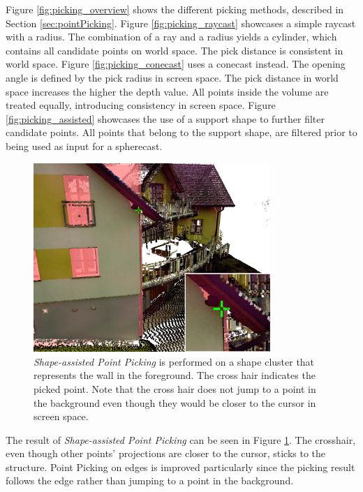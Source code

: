 Figure \ref{fig:picking_overview} shows the different picking methods, described in Section \ref{sec:pointPicking}. Figure \ref{fig:picking_raycast} showcases a simple raycast with a radius. The combination of a ray and a radius yields a cylinder, which contains all candidate points on world space. The pick distance is consistent in world space. Figure \ref{fig:picking_conecast} uses a conecast instead. The opening angle is defined by the pick radius in screen space. The pick distance in world space increases the higher the depth value. All points inside the volume are treated equally, introducing consistency in screen space. Figure \ref{fig:picking_assisted} showcases the use of a support shape to further filter candidate points. All points that belong to the support shape, are filtered prior to being used as input for a spherecast. 


\begin{figure}
    \centering
    \includegraphics[width=0.8\textwidth]{Interactions/picking_assisted_screenshot.png}%
    \caption{\textit{Shape-assisted Point Picking} is performed on a shape cluster that represents the wall in the foreground. The cross hair indicates the picked point. Note that the cross hair does not jump to a point in the background even though they would be closer to the cursor in screen space. }
    \label{fig:picking_assisted_screenshot}
\end{figure}

The result of \textit{Shape-assisted Point Picking} can be seen in Figure \ref{fig:picking_assisted_screenshot}. The crosshair, even though other points' projections are closer to the cursor, sticks to the structure. Point Picking on edges is improved particularly since the picking result follows the edge rather than jumping to a point in the background. 


